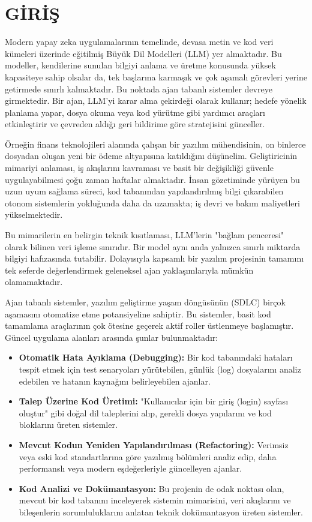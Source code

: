 \chapter{GİRİŞ}
\label{ch:giris}


\label{sec:ajan-mimari}

Modern yapay zeka uygulamalarının temelinde, devasa metin ve kod veri kümeleri üzerinde eğitilmiş Büyük Dil Modelleri (LLM) yer almaktadır. Bu modeller, kendilerine sunulan bilgiyi anlama ve üretme konusunda yüksek kapasiteye sahip olsalar da, tek başlarına karmaşık ve çok aşamalı görevleri yerine getirmede sınırlı kalmaktadır. Bu noktada ajan tabanlı sistemler devreye girmektedir. Bir ajan, LLM'yi karar alma çekirdeği olarak kullanır; hedefe yönelik planlama yapar, dosya okuma veya kod yürütme gibi yardımcı araçları etkinleştirir ve çevreden aldığı geri bildirime göre stratejisini günceller.

Örneğin finans teknolojileri alanında çalışan bir yazılım mühendisinin, on binlerce dosyadan oluşan yeni bir ödeme altyapısına katıldığını düşünelim. Geliştiricinin mimariyi anlaması, iş akışlarını kavraması ve basit bir değişikliği güvenle uygulayabilmesi çoğu zaman haftalar almaktadır. İnsan gözetiminde yürüyen bu uzun uyum sağlama süreci, kod tabanından yapılandırılmış bilgi çıkarabilen otonom sistemlerin yokluğunda daha da uzamakta; iş devri ve bakım maliyetleri yükselmektedir.

Bu mimarilerin en belirgin teknik kısıtlaması, LLM'lerin "bağlam penceresi" olarak bilinen veri işleme sınırıdır. Bir model aynı anda yalnızca sınırlı miktarda bilgiyi hafızasında tutabilir. Dolayısıyla kapsamlı bir yazılım projesinin tamamını tek seferde değerlendirmek geleneksel ajan yaklaşımlarıyla mümkün olamamaktadır.


Ajan tabanlı sistemler, yazılım geliştirme yaşam döngüsünün (SDLC) birçok aşamasını otomatize etme potansiyeline sahiptir. Bu sistemler, basit kod tamamlama araçlarının çok ötesine geçerek aktif roller üstlenmeye başlamıştır. Güncel uygulama alanları arasında şunlar bulunmaktadır:

\begin{itemize}
    \item \textbf{Otomatik Hata Ayıklama (Debugging):} Bir kod tabanındaki hataları tespit etmek için test senaryoları yürütebilen, günlük (log) dosyalarını analiz edebilen ve hatanın kaynağını belirleyebilen ajanlar.
    \item \textbf{Talep Üzerine Kod Üretimi:} "Kullanıcılar için bir giriş (login) sayfası oluştur" gibi doğal dil taleplerini alıp, gerekli dosya yapılarını ve kod bloklarını üreten sistemler.
    \item \textbf{Mevcut Kodun Yeniden Yapılandırılması (Refactoring):} Verimsiz veya eski kod standartlarına göre yazılmış bölümleri analiz edip, daha performanslı veya modern eşdeğerleriyle güncelleyen ajanlar.
    \item \textbf{Kod Analizi ve Dokümantasyon:} Bu projenin de odak noktası olan, mevcut bir kod tabanını inceleyerek sistemin mimarisini, veri akışlarını ve bileşenlerin sorumluluklarını anlatan teknik dokümantasyon üreten sistemler.
\end{itemize}


